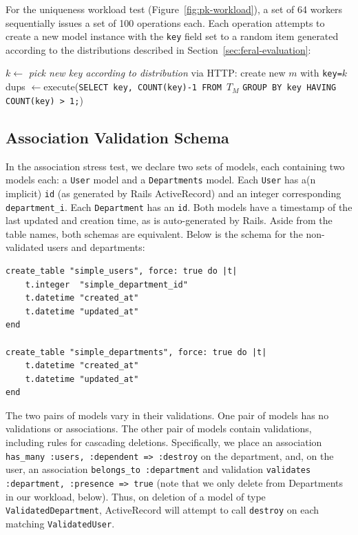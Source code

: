 For the uniqueness workload test (Figure~\ref{fig:pk-workload}), a set of 64 workers sequentially issues a set of 100 operations each. Each operation attempts to create a new model instance with the \texttt{key} field set to a random item generated according to the distributions described in Section~\ref{sec:feral-evaluation}:
\begin{algorithm}[H]
\begin{algorithmic}
      \State $k \gets$ \textit{pick new key according to distribution}
      \State via HTTP: create new $m$ with \texttt{key=$k$}
     \EndFor
   \EndParFor
   \State dups $\gets $execute(\texttt{SELECT key, COUNT(key)-1 FROM $T_M$}
   \State \hspace{6.5em}\texttt{GROUP BY key HAVING COUNT(key) > 1;})
\EndFor
\end{algorithmic}
\end{algorithm}

\subsection{Association Validation Schema}
\label{sec:appendix-association-schema}

In the association stress test, we declare two sets of models, each
containing two models each: a \texttt{User} model and a
\texttt{Departments} model. Each \texttt{User} has a(n implicit)
\texttt{id} (as generated by Rails ActiveRecord) and an integer
corresponding \texttt{department\_i}. Each \texttt{Department} has an
\texttt{id}. Both models have a timestamp of the last updated and
creation time, as is auto-generated by Rails. Aside from the table
names, both schemas are equivalent. Below is the schema for the
non-validated users and departments:
\begin{lstlisting}
create_table "simple_users", force: true do |t|
    t.integer  "simple_department_id"
    t.datetime "created_at"
    t.datetime "updated_at"
end

create_table "simple_departments", force: true do |t|
    t.datetime "created_at"
    t.datetime "updated_at"
end
\end{lstlisting}
The two pairs of models vary in their validations. One pair of models has no validations or associations. The other pair of models contain validations, including rules for cascading deletions. Specifically, we place an association \texttt{has\_many :users, :dependent => :destroy} on the department, and, on the user, an association \texttt{belongs\_to :department} and validation \texttt{validates :department, :presence => true} (note that we only delete from Departments in our workload, below). Thus, on deletion of a model of type \texttt{ValidatedDepartment}, ActiveRecord will attempt to call \texttt{destroy} on each matching \texttt{ValidatedUser}.

